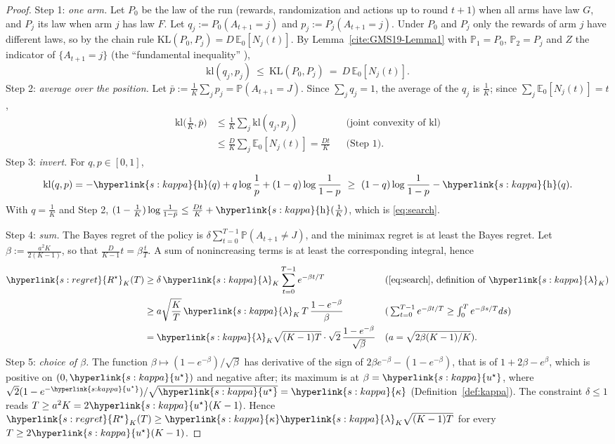 \documentclass[11pt]{article}
\DeclareRobustCommand{\sy}[2]{{\hyperlink{#1}{#2}}}
\newcommand{\E}{\mathbb{E}}
\renewcommand{\P}{\mathbb{P}}
\newcommand{\1}{\mathbf{1}}
\newcommand{\kl}{\mathrm{kl}}
\newcommand{\KL}{\mathrm{KL}}
\newcommand{\Rs}{\sy{s:regret}{R^\star}}
\newcommand{\us}{\sy{s:kappa}{u^\star}}
\newcommand{\kap}{\sy{s:kappa}{\kappa}}
\newcommand{\hb}{\sy{s:kappa}{\mathrm h}}
\newcommand{\lamK}{\sy{s:kappa}{\lambda}}
\begin{document}
\begin{proof}
Step 1: \emph{one arm.} Let $P_0$ be the law of the run (rewards, randomization and actions up to round $t+1$) when all arms have law $G$, and $P_j$ its law when arm $j$ has law $F$.
Let $q_j:=P_0(A_{t+1}=j)$ and $p_j:=P_j(A_{t+1}=j)$. Under $P_0$ and $P_j$ only the rewards of arm $j$ have different laws, so by the chain rule
$\KL(P_0,P_j)=D\,\E_0[N_j(t)]$. By Lemma~\ref{cite:GMS19-Lemma1} with $\mathbb P_1=P_0$, $\mathbb P_2=P_j$ and $Z$ the indicator of $\{A_{t+1}=j\}$ (the ``fundamental inequality'' \citep[(6)]{GMS19}),
\[
\kl(q_j,p_j)\ \le\ \KL(P_0,P_j)\ =\ D\,\E_0[N_j(t)] .
\]
Step 2: \emph{average over the position.} Let $\bar p:=\frac1K\sum_jp_j=\P(A_{t+1}=J)$. Since $\sum_jq_j=1$, the average of the $q_j$ is $\frac1K$; since $\sum_j\E_0[N_j(t)]=t$,
\begin{align*}
\kl\Big(\frac1K,\bar p\Big)&\le\frac1K\sum_j\kl(q_j,p_j) &&\text{(joint convexity of }\kl\text{)}\\
&\le\frac DK\sum_j\E_0[N_j(t)]=\frac{Dt}K &&\text{(Step 1)}.
\end{align*}
Step 3: \emph{invert.} For $q,p\in[0,1]$,
\[
\kl(q,p)=-\hb(q)+q\log\frac1p+(1-q)\log\frac1{1-p}\ \ge\ (1-q)\log\frac1{1-p}-\hb(q).
\]
With $q=\frac1K$ and Step 2, $(1-\frac1K)\log\frac1{1-\bar p}\le\frac{Dt}K+\hb(\frac1K)$, which is \eqref{eq:search}.

Step 4: \emph{sum.} The Bayes regret of the policy is $\delta\sum_{t=0}^{T-1}\P(A_{t+1}\ne J)$, and the minimax regret is at least the Bayes regret. Let $\beta:=\frac{a^2K}{2(K-1)}$, so that
$\frac D{K-1}t=\beta\frac tT$. A sum of nonincreasing terms is at least the corresponding integral, hence
\begin{align*}
\Rs_K(T)&\ge\delta\,\lamK_K\sum_{t=0}^{T-1}e^{-\beta t/T} &&\text{(\eqref{eq:search}, definition of }\lamK_K\text{)}\\
&\ge a\sqrt{\frac KT}\,\lamK_K\,T\,\frac{1-e^{-\beta}}\beta &&\text{(}\textstyle\sum_{t=0}^{T-1}e^{-\beta t/T}\ge\int_0^Te^{-\beta s/T}ds\text{)}\\
&=\lamK_K\sqrt{(K-1)T}\cdot\sqrt2\,\frac{1-e^{-\beta}}{\sqrt\beta} &&\text{(}a=\sqrt{2\beta(K-1)/K}\text{)}.
\end{align*}
Step 5: \emph{choice of $\beta$.} The function $\beta\mapsto(1-e^{-\beta})/\sqrt\beta$ has derivative of the sign of $2\beta e^{-\beta}-(1-e^{-\beta})$, that is of $1+2\beta-e^\beta$, which is positive on
$(0,\us)$ and negative after; its maximum is at $\beta=\us$, where $\sqrt2(1-e^{-\us})/\sqrt{\us}=\kap$ (Definition~\ref{def:kappa}). The constraint $\delta\le1$ reads
$T\ge a^2K=2\us(K-1)$. Hence $\Rs_K(T)\ge\kap\lamK_K\sqrt{(K-1)T}$ for every $T\ge2\us(K-1)$.


\end{proof}
\end{document}
